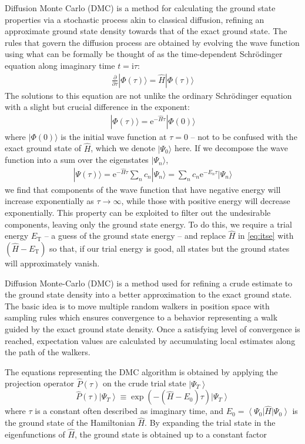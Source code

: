 \documentclass[amsmath, amssymb, aps, floatfix, nofootinbib, preprintnumbers,showpacs, superscriptaddress, twocolumn]{revtex4-1}
\newcommand{\OP}[1]{{\hat{#1}}}
\newcommand{\ket}[1]{\left| #1 \right>}
\newcommand{\bra}[1]{\left< #1 \right|}
\begin{document}
Diffusion Monte Carlo (DMC) is a method for calculating the ground state
properties via a stochastic process akin to classical diffusion, refining an
approximate ground state density towards that of the exact ground state.  The
rules that govern the diffusion process are obtained by evolving the wave
function using what can be formally be thought of as the time-dependent
Schr\"odinger equation along imaginary time $t = \mathrm i \tau$:
\begin{align} \label{eq:itse}
  \frac{\partial}{\partial \tau} |\Phi(\tau)\rangle = \hat H |\Phi(\tau)\rangle
\end{align}
The solutions to this equation are not unlike the ordinary Schr\"odinger
equation with a slight but crucial difference in the exponent:
\begin{align*}
  |\Phi(\tau)\rangle = \mathrm e^{-\hat H \tau} |\Phi(0)\rangle
\end{align*}
where $|\Phi(0)\rangle$ is the initial wave function at $\tau = 0$ -- not to
be confused with the exact ground state of $\hat H$, which we denote
$|\Psi_0\rangle$ here.  If we decompose the wave function into a sum over the
eigenstates $|\Psi_n\rangle$,
\begin{align*}
  |\Psi(\tau)\rangle
  = \mathrm e^{-\hat H \tau} \sum_n c_n |\Psi_n\rangle
  = \sum_n c_n \mathrm e^{-E_n \tau} |\Psi_n\rangle
\end{align*}
we find that components of the wave function that have negative energy will
increase exponentially as $\tau \to \infty$, while those with positive energy
will decrease exponentially.  This property can be exploited to filter out the
undesirable components, leaving only the ground state energy.  To do this, we
require a trial energy $E_{\text{T}}$ -- a guess of the ground state energy --
and replace $\hat H$ in \eqref{eq:itse} with $(\hat H - E_{\text{T}})$ so
that, if our trial energy is good, all states but the ground states will
approximately vanish.

Diffusion Monte-Carlo (DMC) is a method used for refining a crude estimate to the ground state density into a better approximation to the exact ground state. The basic idea is to move multiple random walkers in position space with sampling rules which ensures convergence to a behavior representing a walk guided by the exact ground state density. Once a satisfying level of convergence is reached, expectation values are calculated by accumulating local estimates along the path of the walkers.

The equations representing the DMC algorithm is obtained by applying the projection operator $\OP{P}(\tau)$ on the crude trial state $\ket{\Psi_T}$
\begin{equation}
 \OP{P}(\tau)\ket{\Psi_T} \equiv \exp\left({-(\OP{H} - E_0)\tau}\right)\ket{\Psi_T}
\end{equation}
\noindent
where $\tau$ is a constant often described as imaginary time, and $E_0=\bra{\Psi_0}\OP{H}\ket{\Psi_0}$ is the ground state of the Hamiltonian $\OP{H}$. By expanding the trial state in the eigenfunctions of $\OP{H}$, the ground state is obtained up to a constant factor
\end{document}
